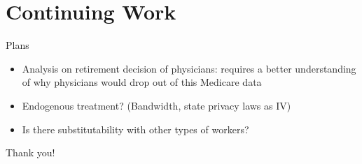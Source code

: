 \documentclass[10pt]{beamer}
\begin{document}
\section{Continuing Work}

\begin{frame}{Plans}
    \begin{itemize}
        \item Analysis on retirement decision of physicians: requires a better understanding of why physicians would drop out of this Medicare data
        \item Endogenous treatment? (Bandwidth, state privacy laws as IV)
        \item Is there substitutability with other types of workers?
    \end{itemize}
\end{frame}

\begin{frame}{}
\centering
    Thank you!
\end{frame}
\end{document}

